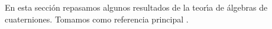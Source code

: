 En esta secci\'{o}n repasamos algunos resultados de la teor\'{\i}a de
\'{a}lgebras de cuaterniones. Tomamos como referencia principal
\cite{Vigneras}.

